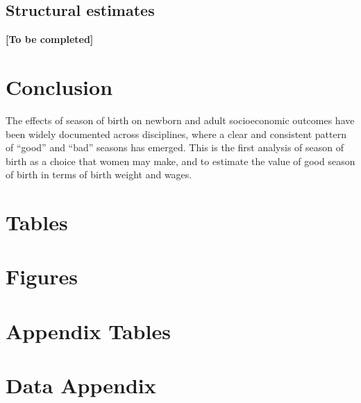 \documentclass[a4paper, 12 pt]{article}
\theoremstyle{plain}
\begin{document}
\begin{doublespace}
\subsection{Structural estimates}
\textbf{[To be completed]}

\newpage

\section{Conclusion}
The effects of season of birth on newborn and adult socioeconomic outcomes have been widely documented across disciplines, where a clear and consistent pattern of ``good'' and ``bad'' seasons has emerged. This is the first analysis of season of birth as a choice that women may make, and to estimate the value of good season of birth in terms of birth weight and wages.



\newpage
%
%
%





\newpage
\section*{Tables}



\newpage
\section*{Figures}



\appendix
\section{Appendix Tables}


\clearpage
%


\section{Data Appendix}
\label{bqScn:datApp}

\end{doublespace}
\end{document}
